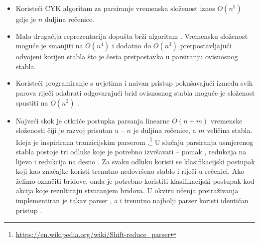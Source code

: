 \begin{itemize}
  \item Koristeći CYK algoritam za parsiranje vremenska složenost iznos $O(n^5)$
  gdje je $n$ duljina rečenice.

  \item Malo drugačija reprezentacija dopušta brži algoritam
  \citep{eisner1999efficient}. Vremensku složenost moguće je smanjiti na
  $O(n^4)$ i dodatno do $O(n^3)$ pretpostavljajući odvojeni korijen 
  stabla što je česta pretpostavka u parsiranju ovisnosnog stabla.

  \item Koristeći programiranje s uvjetima  i
  naivan pristup pokušavajući između svih parova riječi odabrati odgovarajući
  brid ovisnosnog stabla moguće je složenost spustiti na $O(n^2)$
  \citep{covington2001fundamental}.

  \item Najveći skok je otkriće postupka parsanja linearne $O(n + m)$ vremenske
  složenosti čiji je razvoj prisutan u \citep{nivre03efficient,
  zhang2011transition, bohnet2012transition} -- $n$ je duljina rečenice, a $m$
  veličina stabla. Ideja je inspirirana tranzicijskim parserom .\footnote{\url{https://en.wikipedia.org/wiki/Shift-reduce_parser}} U
  slučaju parsiranja usmjerenog stabla postoje tri odluke koje je potrebno
  izvršavati -- pomak , redukcija na lijevo  i
  redukcija na desno . Za svaku odluku koristi se
  klasifikacijski postupak koji kao značajke koristi trenutno nedovršeno stablo
  i riječi u rečenici. Ako želimo označiti bridove, onda je potrebno koristiti
  klasifikacijski postupak kod akcija koje rezultiraju stvaranjem bridova. U
  okviru učenja pretraživanja implementiran je takav parser
  \citep{chang2015learning}, a i trenutno najbolji parser koristi identičan
  pristup \citep{andor2016globally}.

\end{itemize}

